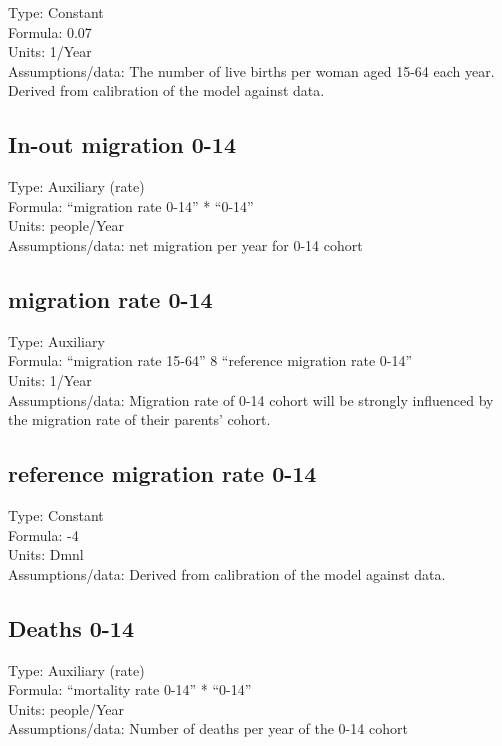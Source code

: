 \documentclass[
  11pt,
]{book}
\begin{document}
Type: Constant\\
Formula: 0.07\\
Units: 1/Year\\
Assumptions/data: The number of live births per woman aged 15-64 each year. Derived from calibration of the model against data.

\hypertarget{in-out-migration-0-14}{%
\subsection{In-out migration 0-14}\label{in-out-migration-0-14}}

Type: Auxiliary (rate)\\
Formula: ``migration rate 0-14'' * ``0-14''\\
Units: people/Year\\
Assumptions/data: net migration per year for 0-14 cohort

\hypertarget{migration-rate-0-14}{%
\subsection{migration rate 0-14}\label{migration-rate-0-14}}

Type: Auxiliary\\
Formula: ``migration rate 15-64'' 8 ``reference migration rate 0-14''\\
Units: 1/Year\\
Assumptions/data: Migration rate of 0-14 cohort will be strongly influenced by the migration rate of their parents' cohort.

\hypertarget{reference-migration-rate-0-14}{%
\subsection{reference migration rate 0-14}\label{reference-migration-rate-0-14}}

Type: Constant\\
Formula: -4\\
Units: Dmnl\\
Assumptions/data: Derived from calibration of the model against data.

\hypertarget{deaths-0-14}{%
\subsection{Deaths 0-14}\label{deaths-0-14}}

Type: Auxiliary (rate)\\
Formula: ``mortality rate 0-14'' * ``0-14''\\
Units: people/Year\\
Assumptions/data: Number of deaths per year of the 0-14 cohort
\end{document}
